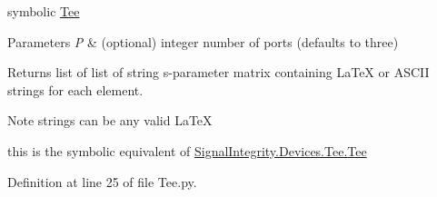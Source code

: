 symbolic \hyperlink{namespaceSignalIntegrity_1_1Symbolic_1_1Tee}{Tee} 


\begin{DoxyParams}{Parameters}
{\em P} & (optional) integer number of ports (defaults to three)~\newline
 \\
\hline
\end{DoxyParams}
\begin{DoxyReturn}{Returns}
list of list of string s-\/parameter matrix containing La\+TeX or A\+S\+C\+II strings for each element. 
\end{DoxyReturn}
\begin{DoxyNote}{Note}
strings can be any valid La\+TeX 

this is the symbolic equivalent of \hyperlink{namespaceSignalIntegrity_1_1Devices_1_1Tee_af0de7f5a03d1e4f045f05d58d151f60a}{Signal\+Integrity.\+Devices.\+Tee.\+Tee} 
\end{DoxyNote}


Definition at line 25 of file Tee.\+py.

